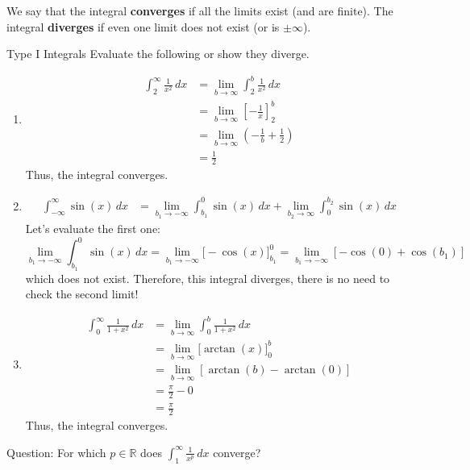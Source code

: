 We say that the integral \textbf{converges} if all the limits exist
(and are finite). The integral \textbf{diverges} if even one limit does
not exist (or is $ \pm\infty $).

\begin{Example}{Type I Integrals}{}
    Evaluate the following or show they diverge.
    \begin{enumerate}[label=(\roman*)]
        \item \begin{align*}
                  \int_{2}^{\infty} \frac{1}{x^2} \, d{x}
                   & =\lim\limits_{{b} \to {\infty}} \int_{2}^{b} \frac{1}{x^2} \, d{x}       \\
                   & = \lim\limits_{{b} \to {\infty}} \left[-\frac{1}{x}  \right]_{2}^b       \\
                   & =\lim\limits_{{b} \to {\infty}} \left( -\frac{1}{b} +\frac{1}{2} \right) \\
                   & =\frac{1}{2}
              \end{align*}
              Thus, the integral converges.
        \item \begin{align*}
                  \int_{-\infty}^{\infty} \sin(x)\, d{x}
                   & =\lim\limits_{{b_1} \to {-\infty}} \int_{b_1}^{0} \sin(x)\, d{x}
                  +\lim\limits_{{b_2} \to {\infty}} \int_{0}^{b_2} \sin(x)\, d{x}
              \end{align*}
              Let's evaluate the first one:
              \[ \lim\limits_{{b_1} \to {-\infty}}\int_{b_1}^{0} \sin(x)\, d{x}
                  = \lim\limits_{{b_1} \to {-\infty}}\bigl[-\cos(x) \bigr]_{b_1}^0
                  =\lim\limits_{{b_1} \to {-\infty}} \left[-\cos(0)+\cos(b_1)\right] \]
              which does not exist. Therefore, this integral
              diverges, there is no need to check the second limit!
        \item \begin{align*}
                  \int_{0}^{\infty} \frac{1}{1+x^2}\, d{x}
                   & =\lim\limits_{{b} \to {\infty}} \int_{0}^{b} \frac{1}{1+x^2} \, d{x} \\
                   & = \lim\limits_{{b} \to {\infty}} \bigl[\arctan(x) \bigr]_{0}^b       \\
                   & =\lim\limits_{{b} \to {\infty}} \left[\arctan(b)-\arctan(0) \right]  \\
                   & =\frac{\pi}{2} -0                                                    \\
                   & =\frac{\pi}{2}
              \end{align*}
              Thus, the integral converges.
    \end{enumerate}
\end{Example}
Question: For which $ p\in\mathbb{R} $ does $ \int_{1}^{\infty} \frac{1}{x^p} \, d{x} $
converge?

